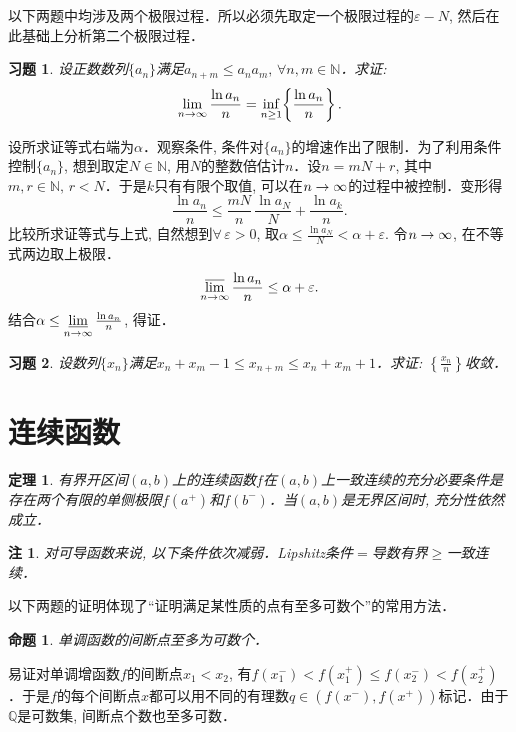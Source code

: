 \documentclass[11pt,a4paper]{ctexart}
\makeatletter
\theoremstyle{thmseries} %
\newtheorem{thm}{定理}[section]
\newtheorem{prop}{命题}[section]
\theoremstyle{exerseries}
\newtheorem{exer}{习题}[section]
\newtheorem*{rem}{注}
\renewenvironment{proof}[1][\proofname]{\par
  \pushQED{\qed}%
  \normalfont \topsep6\p@\@plus6\p@\relax
  \trivlist
  \item[\hskip\labelsep
        \itshape
    #1\@addpunct{}]\ignorespaces
}{%
  \popQED\endtrivlist\@endpefalse
}
\newenvironment{pf}{\begin{proof}[\bfseries\upshape 证\quad]}{\end{proof}}
\newcommand{\bra}[1]{\mathopen{}\left(#1\right)}
\newcommand{\cbra}[1]{\mathopen{}\left\{#1\right\}}
\renewcommand{\epsilon}{\varepsilon}
\newcommand{\N}{\mathbb{N}}
\newcommand{\Q}{\mathbb{Q}}
\def \nti {\mathnormal{n}\to\infty}
\DeclareMathOperator{\llim}{\underset{\nti}{\underline{\lim}}}
\DeclareMathOperator{\ulim}{\underset{\nti}{\overline{\lim}}}
\makeatother
\begin{document}
以下两题中均涉及两个极限过程．所以必须先取定一个极限过程的$\epsilon-N$, 然后在此基础上分析第二个极限过程．
\begin{exer}
	设正数数列$\{a_n\}$满足$a_{n+m}\leq a_na_m,\,\forall n,m\in\N$．求证:
	\[\lim_{\nti}\frac{\ln a_n}{n}=\inf_{n\geq 1}\cbra{\frac{\ln a_n}{n}}.\]
\end{exer}
\begin{pf}
	设所求证等式右端为$\alpha$．观察条件, 条件对$\{a_n\}$的增速作出了限制．为了利用条件控制$\{a_n\}$, 想到取定$N\in\N$, 用$N$的整数倍估计$n$．设$n=mN+r$, 其中$m,r\in\N,\,r<N$．于是$k$只有有限个取值, 可以在$\nti$的过程中被控制．变形得
	\[\frac{\ln a_n}{n}\leq\frac{mN}{n}\,\frac{\ln a_N}{N}+\frac{\ln a_k}{n}.\]
	比较所求证等式与上式, 自然想到$\forall\,\epsilon>0$, 取$\alpha\leq\frac{\ln a_N}{N}<\alpha+\epsilon.$
	令$\nti$, 在不等式两边取上极限．
	\[\ulim\frac{\ln a_n}{n}\leq\alpha+\epsilon.\]
	结合$\alpha\leq\llim\frac{\ln a_n}{n}$, 得证．
\end{pf}

\begin{exer}
	设数列$\{x_n\}$满足$x_n+x_m-1\leq x_{n+m}\leq x_n+x_m+1$．求证: $\cbra{\frac{x_n}{n}}$收敛．
\end{exer}


\section{连续函数}
\begin{thm}
	有界开区间$(a,b)$上的连续函数$f$在$(a,b)$上一致连续的充分必要条件是存在两个有限的单侧极限$f(a^+)$和$f(b^-)$．当$(a,b)$是无界区间时, 充分性依然成立．
\end{thm}
\begin{rem}
	对可导函数来说, 以下条件依次减弱．Lipshitz条件$=$导数有界$\geq$一致连续．
\end{rem}


以下两题的证明体现了``证明满足某性质的点有至多可数个''的常用方法．
\begin{prop}
	单调函数的间断点至多为可数个．
\end{prop}
\begin{pf}
	易证对单调增函数$f$的间断点$x_1<x_2$, 有$f(x_1^-)<f(x_1^+)\leq f(x_2^-)<f(x_2^+)$．于是$f$的每个间断点$x$都可以用不同的有理数$q\in\bra{f(x^-),f(x^+)}$标记．由于$\Q$是可数集, 间断点个数也至多可数．
\end{pf}
\end{document}
